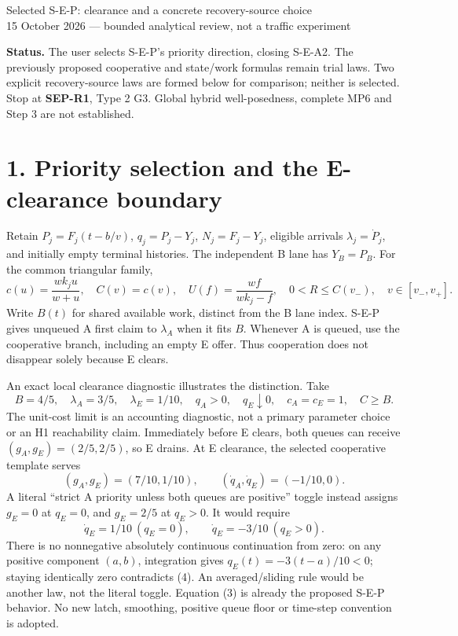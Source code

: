 \documentclass[11pt,a4paper]{article}
\begin{document}
\begin{center}
{\Large Selected S-E-P: clearance and a concrete recovery-source choice}\\[4pt]
15 October 2026 --- bounded analytical review, not a traffic experiment
\end{center}

\textbf{Status.} The user selects S-E-P's priority direction, closing S-E-A2.
The previously proposed cooperative and state/work formulas remain trial
laws. Two explicit recovery-source laws are formed below for comparison;
neither is selected. Stop at \textbf{SEP-R1}, Type 2 G3. Global hybrid
well-posedness, complete MP6 and Step 3 are not established.

\section*{1. Priority selection and the E-clearance boundary}

Retain $P_j=F_j(t-b/v)$, $q_j=P_j-Y_j$, $N_j=F_j-Y_j$, eligible
arrivals $\lambda_j=\dot P_j$, and initially empty terminal histories.
The independent B lane has $Y_B=P_B$. For the common triangular family,
\begin{equation}
 c(u)=\frac{wk_ju}{w+u},\quad C(v)=c(v),\quad
 U(f)=\frac{wf}{wk_j-f},\quad 0<R\leq C(v_-),\quad v\in[v_-,v_+]. \tag{1}
\end{equation}
Write $B(t)$ for shared available work, distinct from the B lane index.
S-E-P gives unqueued A first claim to $\lambda_A$ when it fits $B$.
Whenever A is queued, use the cooperative branch, including an empty E
offer. Thus cooperation does not disappear solely because E clears.

An exact local clearance diagnostic illustrates the distinction. Take
\begin{equation}
 B=4/5,\quad \lambda_A=3/5,\quad \lambda_E=1/10,\quad
 q_A>0,\quad q_E\downarrow0,\quad c_A=c_E=1,\quad C\geq B. \tag{2}
\end{equation}
The unit-cost limit is an accounting diagnostic, not a primary parameter
choice or an H1 reachability claim. Immediately before E clears, both
queues can receive $(g_A,g_E)=(2/5,2/5)$, so E drains. At E clearance,
the selected cooperative template serves
\begin{equation}
 (g_A,g_E)=(7/10,1/10),\qquad
 (\dot q_A,\dot q_E)=(-1/10,0). \tag{3}
\end{equation}
A literal ``strict A priority unless both queues are positive'' toggle
instead assigns $g_E=0$ at $q_E=0$, and $g_E=2/5$ at $q_E>0$.
It would require
\begin{equation}
 \dot q_E=1/10\ (q_E=0),\qquad
 \dot q_E=-3/10\ (q_E>0). \tag{4}
\end{equation}
There is no nonnegative absolutely continuous continuation from zero:
on any positive component $(a,b)$, integration gives
$q_E(t)=-3(t-a)/10<0$; staying identically zero contradicts (4).
An averaged/sliding rule would be another law, not the literal toggle.
Equation (3) is already the proposed S-E-P behavior. No new latch,
smoothing, positive queue floor or time-step convention is adopted.
\end{document}
